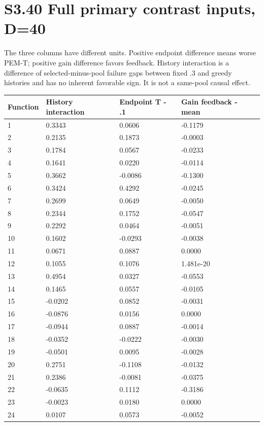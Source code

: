 \documentclass[11pt,a4paper]{article}
\begin{document}
\newpage

\hypertarget{s3.40-full-primary-contrast-inputs-d40}{%
\section{S3.40 Full primary contrast inputs,
D=40}\label{s3.40-full-primary-contrast-inputs-d40}}

The three columns have different units. Positive endpoint difference
means worse PEM-T; positive gain difference favors feedback. History
interaction is a difference of selected-minus-pool failure gaps between
fixed .3 and greedy histories and has no inherent favorable sign. It is
not a same-pool causal effect.

\par\noindent\begin{minipage}{\linewidth}

\begin{longtable}[]{@{}llll@{}}
\toprule
Function & History interaction & Endpoint T - .1 & Gain feedback -
mean \\
\midrule
\endhead
1 & 0.3343 & 0.0606 & -0.1179 \\
2 & 0.2135 & 0.1873 & -0.0003 \\
3 & 0.1784 & 0.0567 & -0.0233 \\
4 & 0.1641 & 0.0220 & -0.0114 \\
5 & 0.3662 & -0.0086 & -0.1300 \\
6 & 0.3424 & 0.4292 & -0.0245 \\
7 & 0.2699 & 0.0649 & -0.0050 \\
8 & 0.2344 & 0.1752 & -0.0547 \\
9 & 0.2292 & 0.0464 & -0.0051 \\
10 & 0.1602 & -0.0293 & -0.0038 \\
11 & 0.0671 & 0.0887 & 0.0000 \\
12 & 0.1055 & 0.1076 & 1.481e-20 \\
13 & 0.4954 & 0.0327 & -0.0553 \\
14 & 0.1465 & 0.0557 & -0.0105 \\
15 & -0.0202 & 0.0852 & -0.0031 \\
16 & -0.0876 & 0.0156 & 0.0000 \\
17 & -0.0944 & 0.0887 & -0.0014 \\
18 & -0.0352 & -0.0222 & -0.0030 \\
19 & -0.0501 & 0.0095 & -0.0028 \\
20 & 0.2751 & -0.1108 & -0.0132 \\
21 & 0.2386 & -0.0081 & -0.0375 \\
22 & -0.0635 & 0.1112 & -0.3186 \\
23 & -0.0023 & 0.0180 & 0.0000 \\
24 & 0.0107 & 0.0573 & -0.0052 \\
\bottomrule
\end{longtable}

\end{minipage}\par
\end{document}
